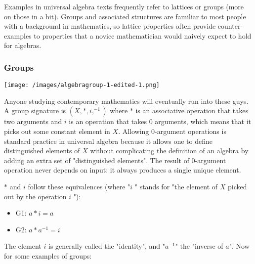\documentclass{article} %
\begin{document}
Examples in universal algebra texts frequently refer to lattices or groups (more on those in a bit). Groups and associated structures are familiar to most people with a background in mathematics, so lattice properties often provide counter-examples to properties that a novice mathematician would naively expect to hold for algebras.

\subsubsection{Groups}

\texttt{[image: /images/algebragroup-1-edited-1.png]}

Anyone studying contemporary mathematics will eventually run into these guys. A group signature is $ (X, \ast, i, ^{-1})$ where $ \ast$ is an associative operation that takes two arguments and $ i$ is an operation that takes 0 arguments, which means that it picks out some constant element in $ X$. Allowing 0-argument operations is standard practice in universal algebra because it allows one to define distinguished elements of $ X$ without complicating the definition of an algebra by adding an extra set of "distinguished elements". The result of 0-argument operation never depends on input: it always produces a single unique element.

$ \ast$ and $i$ follow these equivalences (where "$ i$ " stands for "the element of $ X$ picked out by the operation $ i$ "):

\begin{itemize}
\item{G1: $ a \ast i = a$}
\item{G2: $ a \ast a^{-1} = i$}
\end{itemize}

The element $ i$ is generally called the "identity", and "$ a^{-1}$" the "inverse of $ a$". Now for some examples of groups:
\end{document}
